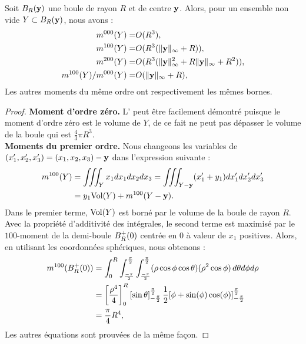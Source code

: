 \begin{lemma}\label{lem:moment-ball}
  Soit $B_{R}(\mathbf{y})$ une boule de rayon $R$ et de centre $\mathbf{y}$. Alors, pour un
  ensemble non vide $Y \subset B_{R}(\mathbf{y})$, nous avons :
  \begin{align}
    m^{000}(Y) =& O(R^3), \label{eq:ball-moment-0}\\
    m^{100}(Y) =& O(R^3(\|\mathbf{y}\|_\infty + R)), \label{eq:ball-moment-1}\\
    m^{200}(Y) =& O(R^3(\|\mathbf{y}\|^2_\infty + R\|\mathbf{y}\|_\infty + R^2)), \label{eq:ball-moment-2}\\
    m^{100}(Y)/m^{000}(Y) =& O(\|\mathbf{y}\|_\infty + R), \label{eq:ball-moment-1bis}
  \end{align}
  Les autres moments du même ordre ont respectivement les mêmes bornes.
\end{lemma}
\begin{proof}
  \textbf{Moment d'ordre zéro.\quad}
  L' peut être facilement démontré puisque le
  moment d'ordre zéro est le volume de $Y$, de ce fait ne peut pas dépasser le
  volume de la boule qui est $\frac{4}{3}\pi R^3$.
  \textbf{\\Moments du premier ordre.\quad}
  Nous changeons les variables de $(x_1',x_2',x_3')=(x_1,x_2,x_3)-\mathbf{y}$ dans
  l'expression suivante :
  \begin{align}
    m^{100}(Y) &= \iiint_Y x_1 dx_1 dx_2 dx_3 = \iiint_{Y-\mathbf{y}} (x_1'+y_1) dx_1'dx_2'dx_3' \\
                 &= y_1 \mathrm{Vol}(Y) + m^{100}(Y-\mathbf{y}).
  \end{align}
  Dans le premier terme, $\mathrm{Vol}(Y)$ est borné par le volume de la boule de rayon
  $R$. Avec la propriété d'additivité des intégrales, le second terme est
  maximisé par le $100$-moment de la demi-boule $B^+_{R}(0)$ centrée en $0$ à
  valeur de $x_1$ positives. Alors, en utilisant les coordonnées sphériques,
  nous obtenons :
  \begin{align}
    m^{100}(B^+_{R}(0))
    &= \int_{0}^{R} \int_{\frac{-\pi}{2}}^{\frac{\pi}{2}} \int_{\frac{-\pi}{2}}^{\frac{\pi}{2}} (\rho\cos\phi\cos\theta)(\rho^2 \cos\phi)  \, d\theta d\phi d\rho \\
    &= \left[\frac{\rho^4}{4} \right]_{0}^{R}  \left [\sin\theta\right ]^\frac{\pi}{2}_{-\frac{\pi}{2}}\frac{1}{2} [\phi + \sin(\phi)\cos(\phi)]^\frac{\pi}{2}_{-\frac{\pi}{2}} \\
    &= \frac{\pi}{4}R^4, \label{eq:exact-half-ball-moment-1}
  \end{align}
  Les autres équations sont prouvées de la même façon.
\end{proof}
